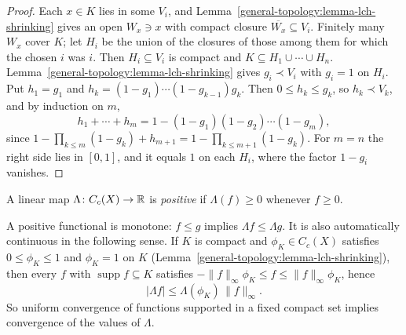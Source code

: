 \begin{proof}
Each $x \in K$ lies in some $V_i$, and Lemma~\ref{general-topology:lemma-lch-shrinking} gives an open $W_x \ni x$ with compact closure $\overline{W_x} \subseteq V_i$. Finitely many $W_x$ cover $K$; let $H_i$ be
the union of the closures of those among them for which the chosen $i$ was $i$. Then $H_i \subseteq V_i$ is compact and $K \subseteq H_1 \cup \cdots \cup H_n$. Lemma~\ref{general-topology:lemma-lch-shrinking}
gives $g_i \prec V_i$ with $g_i = 1$ on $H_i$. Put $h_1 = g_1$ and $h_k = (1 - g_1)\cdots(1 - g_{k-1})g_k$. Then $0 \leq h_k \leq g_k$, so $h_k \prec V_k$, and by induction on $m$,
\[
h_1 + \cdots + h_m = 1 - (1 - g_1)(1 - g_2)\cdots(1 - g_m),
\]
since $1 - \prod_{k \leq m}(1 - g_k) + h_{m+1} = 1 - \prod_{k \leq m+1}(1 - g_k)$. For $m = n$ the right side lies in $[0, 1]$, and it equals $1$ on each $H_i$, where the factor $1 - g_i$ vanishes.
\end{proof}

\begin{definition}\label{measure-theory:definition-positive-functional}
A linear map $\Lambda \colon C_c(X) \to \mathbb{R}$ is \emph{positive} if $\Lambda(f) \geq 0$ whenever $f \geq 0$.
\end{definition}

A positive functional is monotone: $f \leq g$ implies $\Lambda f \leq \Lambda g$. It is also automatically continuous in the following sense. If $K$ is compact and $\phi_K \in C_c(X)$ satisfies
$0 \leq \phi_K \leq 1$ and $\phi_K = 1$ on $K$ (Lemma~\ref{general-topology:lemma-lch-shrinking}), then every $f$ with $\operatorname{supp}f \subseteq K$ satisfies
$-\|f\|_\infty\phi_K \leq f \leq \|f\|_\infty\phi_K$, hence
\[
|\Lambda f| \leq \Lambda(\phi_K)\,\|f\|_\infty .
\]
So uniform convergence of functions supported in a fixed compact set implies convergence of the values of $\Lambda$.

